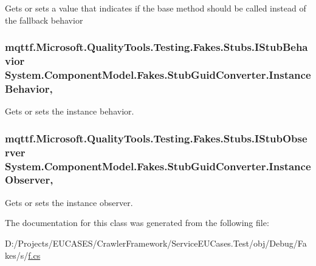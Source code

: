 Gets or sets a value that indicates if the base method should be called instead of the fallback behavior

\hypertarget{class_system_1_1_component_model_1_1_fakes_1_1_stub_guid_converter_aa3c1033b48ef065ddedd8a50a93162e5}{
\subsubsection[{Instance\-Behavior}]{\setlength{\rightskip}{0pt plus 5cm}mqttf.\-Microsoft.\-Quality\-Tools.\-Testing.\-Fakes.\-Stubs.\-I\-Stub\-Behavior System.\-Component\-Model.\-Fakes.\-Stub\-Guid\-Converter.\-Instance\-Behavior\hspace{0.3cm}{\ttfamily [get]}, {\ttfamily [set]}}}\label{class_system_1_1_component_model_1_1_fakes_1_1_stub_guid_converter_aa3c1033b48ef065ddedd8a50a93162e5}


Gets or sets the instance behavior.

\hypertarget{class_system_1_1_component_model_1_1_fakes_1_1_stub_guid_converter_a062d84f8d86469e9725be75a0f3d2587}{
\subsubsection[{Instance\-Observer}]{\setlength{\rightskip}{0pt plus 5cm}mqttf.\-Microsoft.\-Quality\-Tools.\-Testing.\-Fakes.\-Stubs.\-I\-Stub\-Observer System.\-Component\-Model.\-Fakes.\-Stub\-Guid\-Converter.\-Instance\-Observer\hspace{0.3cm}{\ttfamily [get]}, {\ttfamily [set]}}}\label{class_system_1_1_component_model_1_1_fakes_1_1_stub_guid_converter_a062d84f8d86469e9725be75a0f3d2587}


Gets or sets the instance observer.



The documentation for this class was generated from the following file\-:\begin{DoxyCompactItemize}
\item 
D\-:/\-Projects/\-E\-U\-C\-A\-S\-E\-S/\-Crawler\-Framework/\-Service\-E\-U\-Cases.\-Test/obj/\-Debug/\-Fakes/s/\hyperlink{s_2f_8cs}{f.\-cs}\end{DoxyCompactItemize}

